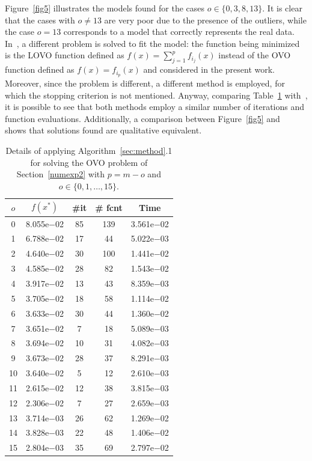 \documentclass[11pt]{article}
\begin{document}
Figure~\ref{fig5} illustrates the models found for the cases $o \in \{ 0, 3, 8, 13 \}$. It is clear that the cases with $o \neq 13$ are very poor due to the presence of the outliers, while the case $o=13$ corresponds to a model that correctly represents the real data. In~\cite{yano2}, a different problem is solved to fit the model: the function being minimized is the LOVO function defined as $f(x) = \sum_{j=1}^p f_{i_j}(x)$ instead of the OVO function defined as $f(x) = f_{i_p}(x)$ and considered in the present work. Moreover, since the problem is different, a different method is employed, for which the stopping criterion is not mentioned. Anyway, comparing Table~\ref{tab3} with~\cite[p.~18, Table~1]{yano2}, it is possible to see that both methods employ a similar number of iterations and function evaluations. Additionally, a comparison between Figure~\ref{fig5} and~\cite[p.~18, Figure~2]{yano2} shows that solutions found are qualitative equivalent.

\begin{table}[ht!]
\begin{center}
\begin{tabular}{|c|c|c|c|c|}
\hline
$o$ & $f(x^*)$ & \#it & \# fcnt & Time\\
\hline
\hline
   0 &  8.055e$-$02 &  85 &  139 &  3.561e$-$02 \\
   1 &  6.788e$-$02 &  17 &   44 &  5.022e$-$03 \\
   2 &  4.640e$-$02 &  30 &  100 &  1.441e$-$02 \\
   3 &  4.585e$-$02 &  28 &   82 &  1.543e$-$02 \\
   4 &  3.917e$-$02 &  13 &   43 &  8.359e$-$03 \\
   5 &  3.705e$-$02 &  18 &   58 &  1.114e$-$02 \\
   6 &  3.633e$-$02 &  30 &   44 &  1.360e$-$02 \\
   7 &  3.651e$-$02 &   7 &   18 &  5.089e$-$03 \\
   8 &  3.694e$-$02 &  10 &   31 &  4.082e$-$03 \\
   9 &  3.673e$-$02 &  28 &   37 &  8.291e$-$03 \\
  10 &  3.640e$-$02 &   5 &   12 &  2.610e$-$03 \\
  11 &  2.615e$-$02 &  12 &   38 &  3.815e$-$03 \\
  12 &  2.306e$-$02 &   7 &   27 &  2.659e$-$03 \\
  13 &  3.714e$-$03 &  26 &   62 &  1.269e$-$02 \\
  14 &  3.828e$-$03 &  22 &   48 &  1.406e$-$02 \\
  15 &  2.804e$-$03 &  35 &   69 &  2.797e$-$02 \\
\hline
\end{tabular}
\end{center}
\caption{Details of applying Algorithm~\ref{sec:method}.1 for solving the OVO problem of Section~\ref{numexp2} with $p=m-o$ and $o \in \{0, 1,\dots,15\}$.}
\label{tab3}
\end{table}
\end{document}
